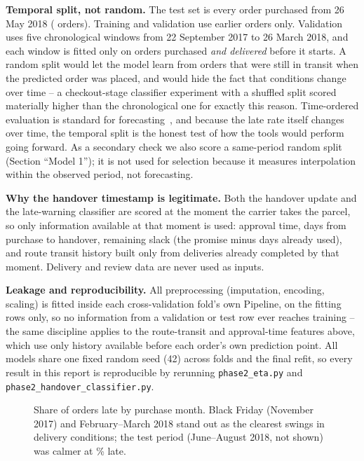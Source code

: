 \documentclass[12pt,a4paper]{article}
\begin{document}
\textbf{Temporal split, not random.} The test set is every order purchased from 26 May 2018 (\TestOrders{} orders). Training and validation use earlier orders only. Validation uses five chronological windows from 22 September 2017 to 26 March 2018, and each window is fitted only on orders purchased \emph{and delivered} before it starts. A random split would let the model learn from orders that were still in transit when the predicted order was placed, and would hide the fact that conditions change over time -- a checkout-stage classifier experiment with a shuffled split scored materially higher than the chronological one for exactly this reason. Time-ordered evaluation is standard for forecasting~\cite{bergmeir2012}, and because the late rate itself changes over time, the temporal split is the honest test of how the tools would perform going forward. As a secondary check we also score a same-period random split (Section ``Model 1''); it is not used for selection because it measures interpolation within the observed period, not forecasting.

\textbf{Why the handover timestamp is legitimate.} Both the handover update and the late-warning classifier are scored at the moment the carrier takes the parcel, so only information available at that moment is used: approval time, days from purchase to handover, remaining slack (the promise minus days already used), and route transit history built only from deliveries already completed by that moment. Delivery and review data are never used as inputs.

\textbf{Leakage and reproducibility.} All preprocessing (imputation, encoding, scaling) is fitted inside each cross-validation fold's own Pipeline, on the fitting rows only, so no information from a validation or test row ever reaches training -- the same discipline applies to the route-transit and approval-time features above, which use only history available before each order's own prediction point. All models share one fixed random seed (42) across folds and the final refit, so every result in this report is reproducible by rerunning \texttt{phase2\_eta.py} and \texttt{phase2\_handover\_classifier.py}.

\begin{figure}[ht]
\centering

\caption{Share of orders late by purchase month. Black Friday (November 2017) and February--March 2018 stand out as the clearest swings in delivery conditions; the test period (June--August 2018, not shown) was calmer at \ClsTestLate{}\% late.}
\label{fig:monthly}
\end{figure}
\end{document}

